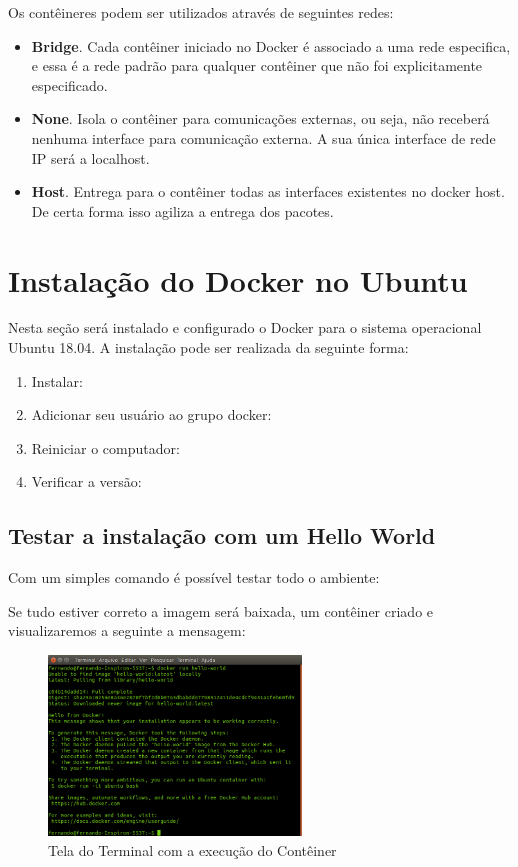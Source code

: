 \documentclass[a4paper,11pt]{article}
\begin{document}
Os contêineres podem ser utilizados através de seguintes redes: \vspace{-1em}
\begin{itemize}
  \item \textbf{Bridge}. Cada contêiner iniciado no Docker é associado a uma rede especifica, e essa é a rede padrão para qualquer contêiner que não foi explicitamente especificado.
  \item \textbf{None}. Isola o contêiner para comunicações externas, ou seja, não receberá nenhuma interface para comunicação externa. A sua única interface de rede IP será a localhost.
  \item \textbf{Host}. Entrega para o contêiner todas as interfaces existentes no docker host. De certa forma isso agiliza a entrega dos pacotes.
\end{itemize}

\section{Instalação do Docker no Ubuntu}
Nesta seção será instalado e configurado o Docker para o sistema operacional Ubuntu 18.04. A instalação pode ser realizada da seguinte forma: \vspace{-1em}
\begin{enumerate}
  \item Instalar: 
  \item Adicionar seu usuário ao grupo docker: 
  \item Reiniciar o computador: 
  \item Verificar a versão: 
\end{enumerate}

\subsection{Testar a instalação com um Hello World}
Com um simples comando é possível testar todo o ambiente: \\

Se tudo estiver correto a imagem será baixada, um contêiner criado e visualizaremos a seguinte a mensagem:
\begin{figure}[H]
	\centering
	\includegraphics[width=0.6\textwidth]{imagem/hello.png}
	\caption{Tela do Terminal com a execução do Contêiner}
\end{figure}
\end{document}
